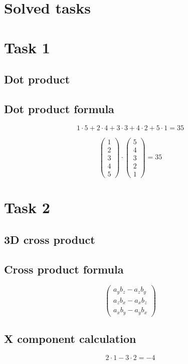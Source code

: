 \documentclass{article}
\begin{document}
\section*{Solved tasks}
\section*{Task 1}

\subsection*{Dot product}
\subsection*{ \vspace{1em} Dot product formula}
\[
1 \cdot 5 + 2 \cdot 4 + 3 \cdot 3 + 4 \cdot 2 + 5 \cdot 1 = 35
\]
\medskip

\[
\begin{pmatrix}1 \\ 2 \\ 3 \\ 4 \\ 5\end{pmatrix} \cdot \begin{pmatrix}5 \\ 4 \\ 3 \\ 2 \\ 1\end{pmatrix} = 35
\]
\bigskip

\hrulefill
\bigskip

\section*{Task 2}

\subsection*{3D cross product}
\subsection*{ \vspace{1em} Cross product formula}
\[
\begin{pmatrix}
a_y b_z - a_z b_y \\
a_z b_x - a_x b_z \\
a_x b_y - a_y b_x
\end{pmatrix}
\]
\subsection*{ \vspace{1em} X component calculation}
\[
2 \cdot 1 - 3 \cdot 2 = -4
\]
\end{document}
